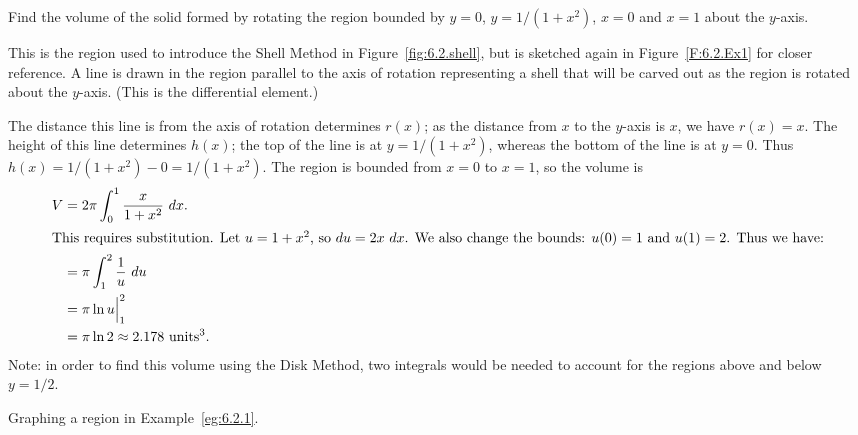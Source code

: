 \begin{example} \label{eg:6.2.1} %
Find the volume of the solid formed by rotating the region bounded by $y=0$, $y=1/(1+x^2)$, $x=0$ and $x=1$ about the $y$-axis.

\solution This is the region used to introduce the Shell Method in Figure~\ref{fig:6.2.shell}, but is sketched again in Figure~\ref{F:6.2.Ex1} for closer reference. A line is drawn in the region parallel to the axis of rotation representing a shell that will be carved out as the region is rotated about the $y$-axis. (This is the differential element.)

The distance this line is from the axis of rotation determines $r(x)$; as the distance from $x$ to the $y$-axis is $x$, we have $r(x)=x$. The height of this line determines $h(x)$; the top of the line is at $y=1/(1+x^2)$, whereas the bottom of the line is at $y=0$. Thus $h(x) = 1/(1+x^2)-0 = 1/(1+x^2)$. The region is bounded from $x=0$ to $x=1$, so the volume is 
\begin{align*}
V 	&= 2\pi\int_0^1 \frac{x}{1+x^2}\ dx. \\
\intertext{This requires substitution. Let $u=1+x^2$, so $du = 2x\ dx$. We also change the bounds: $u(0) = 1$ and $u(1) = 2$. Thus we have:}
&= \pi\int_1^2 \frac{1}{u}\ du \\
&= \pi\ln u\Big|_1^2\\
&= \pi\ln 2 \approx 2.178 \ \text{units}^3.
\end{align*}
Note: in order to find this volume using the Disk Method, two integrals would be needed to account for the regions above and below $y=1/2$.
\end{example}

\begin{marginfigure}[-14cm] %
\caption{Graphing a region in Example~\ref{eg:6.2.1}.} \label{F:6.2.Ex1}
\end{marginfigure}